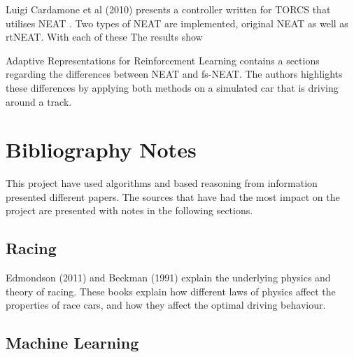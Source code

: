 
Luigi Cardamone et al (2010) presents a controller written for TORCS that utilises NEAT \cite{cardamone2010learning}. Two types of NEAT are implemented, original NEAT as well as rtNEAT. With each of these The results show 

Adaptive Representations for Reinforcement Learning contains a sections regarding the differences between NEAT and fs-NEAT. The authors highlights these differences by applying both methods on a simulated car that is driving around a track. 








\section{Bibliography Notes}
This project have used algorithms and based reasoning from information presented different papers. The sources that have had the most impact on the project are presented with notes in the following sections.

\subsection{Racing}

Edmondson (2011) and Beckman (1991) explain the underlying physics and theory of racing. These books explain how different laws of physics affect the properties of race cars, and how they affect the optimal driving behaviour. 


\subsection{Machine Learning}

